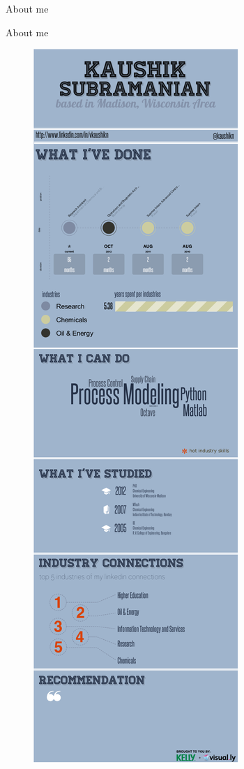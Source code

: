 \documentclass[table]{beamer}
\begin{document}
{\begin{frame}{About me}
\begin{figure}
   \end{figure}
 \end{frame}
 \begin{frame}{About me}
   \begin{figure}
    \includegraphics[scale = 0.75]{experience.pdf}

\end{figure}
\end{frame}}
\end{document}
